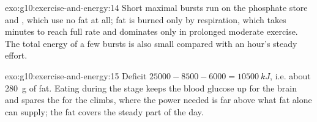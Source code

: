 \begin{solution}{exo:g10:exercise-and-energy:14}
Short maximal bursts run on the phosphate store and ,
which use no fat at all; fat is burned only by respiration, which
takes minutes to reach full rate and dominates only in prolonged
moderate exercise. The total energy of a few bursts is also small
compared with an hour's steady effort.
\end{solution}

\begin{solution}{exo:g10:exercise-and-energy:15}
Deficit $25000 - 8500 - 6000 = \qty{10500}{kJ}$, i.e. about
\qty{280}{g} of fat. Eating during the stage keeps the blood glucose
up for the brain and spares the  for the climbs, where the
power needed is far above what fat alone can supply; the fat covers
the steady part of the day.
\end{solution}

